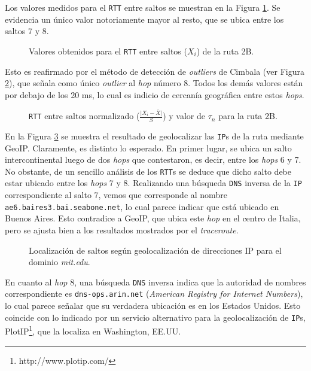 Los valores medidos para el \texttt{RTT} entre saltos se muestran en
la Figura \ref{res:escC:rtt}. Se evidencia un único valor notoriamente mayor
al resto, que se ubica entre los saltos 7 y 8.

\begin{figure}[H]
    \caption{Valores obtenidos para el \texttt{RTT} entre saltos ($X_i$) de la ruta 2B.}
    \label{res:escC:rtt}
\end{figure}

Esto es reafirmado por el método de detección de \emph{outliers} de Cimbala
(ver Figura \ref{res:escC:rttnorm}), que señala como único \emph{outlier} al
\emph{hop} número 8. Todos los demás valores están por debajo de los 20 ms,
lo cual es indicio de cercanía geográfica entre estos \emph{hops}.

\begin{figure}[H]
    \caption{\texttt{RTT} entre saltos normalizado ($\frac{\vert X_i-\bar{X}\vert}{S}$)
    y valor de $\tau_n$ para la ruta 2B.}
    \label{res:escC:rttnorm}
\end{figure}

En la Figura \ref{res:escC:map} se muestra el resultado de geolocalizar las
\texttt{IP}s de la ruta mediante GeoIP. Claramente, es distinto lo esperado.
En primer lugar, se ubica un salto intercontinental luego de dos \emph{hops}
que contestaron, es decir, entre los \emph{hops} 6 y 7. No obstante, de
un sencillo análisis de los \texttt{RTT}s se deduce que dicho salto debe
estar ubicado entre los \emph{hops} 7 y 8. Realizando una búsqueda
\texttt{DNS} inversa de la \texttt{IP} correspondiente al salto 7, vemos que
corresponde al nombre \texttt{ae6.baires3.bai.seabone.net}, lo cual parece
indicar que está ubicado en Buenos Aires. Esto contradice a GeoIP, que ubica
este \emph{hop} en el centro de Italia, pero se ajusta bien a los resultados
mostrados por el \emph{traceroute}.

\begin{figure}[H]
    \caption{Localización de saltos según geolocalización de direcciones IP para
    el dominio \emph{mit.edu}.}
    \label{res:escC:map}
\end{figure}

En cuanto al \emph{hop} 8, una búsqueda \texttt{DNS} inversa indica que la
autoridad de nombres correspondiente es \texttt{dns-ops.arin.net}
(\emph{American Registry for Internet Numbers}), lo cual parece señalar que
su verdadera ubicación es en los Estados Unidos. Esto coincide con lo indicado
por un servicio alternativo para la geolocalización de \texttt{IP}s,
PlotIP\footnote{http://www.plotip.com/}, que la localiza en Washington, EE.UU.

